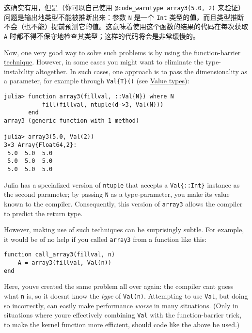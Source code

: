 这确实有用，但是（你可以自己使用 \texttt{@code\_warntype array3(5.0, 2)} 来验证）问题是输出地类型不能被推断出来：参数 \texttt{N} 是一个 \texttt{Int} 类型的\textbf{值}，而且类型推断不会（也不能）提前预测它的值。这意味着使用这个函数的结果的代码在每次获取 \texttt{A} 时都不得不保守地检查其类型；这样的代码将会是非常缓慢的。



Now, one very good way to solve such problems is by using the \hyperlink{17509985600836810807}{function-barrier technique}. However, in some cases you might want to eliminate the type-instability altogether. In such cases, one approach is to pass the dimensionality as a parameter, for example through \texttt{Val\{T\}()} (see \href{@ref}{{\textquotedbl}Value types{\textquotedbl}}):




\begin{verbatim}
julia> function array3(fillval, ::Val{N}) where N
           fill(fillval, ntuple(d->3, Val(N)))
       end
array3 (generic function with 1 method)

julia> array3(5.0, Val(2))
3×3 Array{Float64,2}:
 5.0  5.0  5.0
 5.0  5.0  5.0
 5.0  5.0  5.0
\end{verbatim}



Julia has a specialized version of \texttt{ntuple} that accepts a \texttt{Val\{::Int\}} instance as the second parameter; by passing \texttt{N} as a type-parameter, you make its {\textquotedbl}value{\textquotedbl} known to the compiler. Consequently, this version of \texttt{array3} allows the compiler to predict the return type.



However, making use of such techniques can be surprisingly subtle. For example, it would be of no help if you called \texttt{array3} from a function like this:




\begin{verbatim}
function call_array3(fillval, n)
    A = array3(fillval, Val(n))
end
\end{verbatim}



Here, you{\textquotesingle}ve created the same problem all over again: the compiler can{\textquotesingle}t guess what \texttt{n} is, so it doesn{\textquotesingle}t know the \emph{type} of \texttt{Val(n)}. Attempting to use \texttt{Val}, but doing so incorrectly, can easily make performance \emph{worse} in many situations. (Only in situations where you{\textquotesingle}re effectively combining \texttt{Val} with the function-barrier trick, to make the kernel function more efficient, should code like the above be used.)



